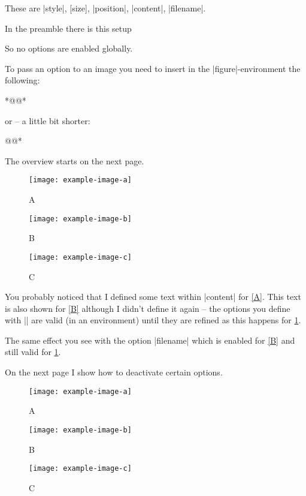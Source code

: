 \documentclass[a4paper,
10pt,
english
]{ltxdoc}
\begin{document}
These are |style|, [size], |position|, |content|, |filename|.

In the preamble there is this setup
\begin{code}
\usepackage{draftfigure}
\end{code}
So no options are enabled globally.

To pass an option to an image you need to insert in the |figure|-environment the following:
\begin{code}
*@@*
\end{code}
or -- a little bit shorter:
\begin{code}
\setdf*@@*
\end{code}

The overview starts on the next page.
\clearpage 
{}
\begin{codeexample}
\begin{figure}[H]
 \centering
  \texttt{[image: example-image-a]}
  \caption{A}\label{A}
  \texttt{[image: example-image-b]}
  \caption{B}\label{B}
  \texttt{[image: example-image-c]}
  \caption{C}\label{C}
\end{figure}
\end{codeexample}
You probably noticed that I defined some text within |content| for \cref{A}.
This text is also shown for \cref{B} although I didn’t define it again --
the options you define with ||
are valid (in an environment) until they are refined 
as this happens for \cref{C}.

The same effect you see with the option |filename| which is enabled for \cref{B} and still valid for \cref{C}.

On the next page I show how to deactivate certain options.
\clearpage
\begin{codeexample}
\begin{figure}[H]
 \centering
  \texttt{[image: example-image-a]}
  \caption{A}\label{A1}
 
  \texttt{[image: example-image-b]}
  \caption{B}\label{B1}

  \texttt{[image: example-image-c]}
  \caption{C}\label{C1}
\end{figure}
\end{codeexample}
\end{document}
